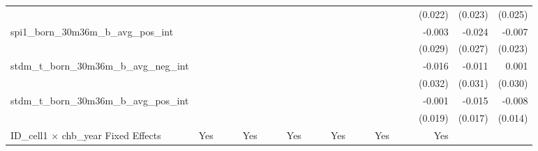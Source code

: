 \begin{tabular}{lrrrrrrrrrrrrrrrrrr}
                                            &              &              &              &              &              &              &              &              &               &              &              &               &              &              &               &      (0.022) &      (0.023) &       (0.025) \\ 
spi1\_born\_30m36m\_b\_avg\_pos\_int        &              &              &              &              &              &              &              &              &               &              &              &               &              &              &               &       -0.003 &       -0.024 &        -0.007 \\ 
                                            &              &              &              &              &              &              &              &              &               &              &              &               &              &              &               &      (0.029) &      (0.027) &       (0.023) \\ 
stdm\_t\_born\_30m36m\_b\_avg\_neg\_int     &              &              &              &              &              &              &              &              &               &              &              &               &              &              &               &       -0.016 &       -0.011 &         0.001 \\ 
                                            &              &              &              &              &              &              &              &              &               &              &              &               &              &              &               &      (0.032) &      (0.031) &       (0.030) \\ 
stdm\_t\_born\_30m36m\_b\_avg\_pos\_int     &              &              &              &              &              &              &              &              &               &              &              &               &              &              &               &       -0.001 &       -0.015 &        -0.008 \\ 
                                            &              &              &              &              &              &              &              &              &               &              &              &               &              &              &               &      (0.019) &      (0.017) &       (0.014) \\ 
\midrule
ID\_cell1 $\times$ chb\_year Fixed Effects  &          Yes &              &              &          Yes &              &              &          Yes &              &               &          Yes &              &               &          Yes &              &               &          Yes &              &               \\ 

\end{tabular}
